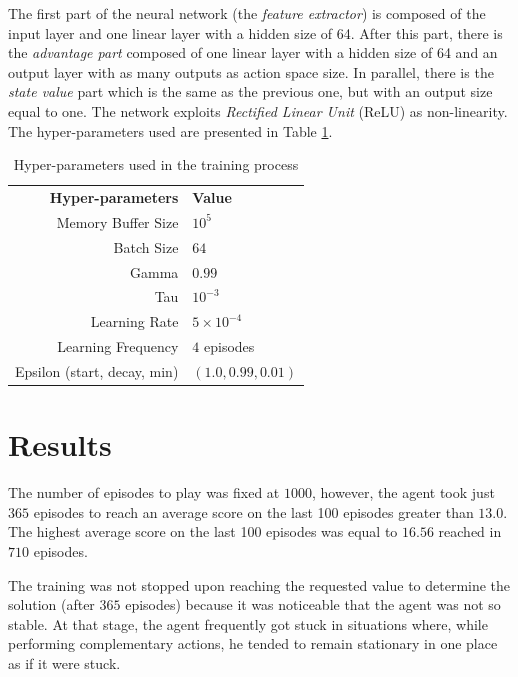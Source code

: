 \documentclass[letterpaper]{article}
\begin{document}
The first part of the neural network (the \textit{feature extractor}) is composed of the input layer and one linear layer with a hidden size of 64. After this part, there is the \textit{advantage part} composed of one linear layer with a hidden size of 64 and an output layer with as many outputs as action space size. In parallel, there is the \textit{state value} part which is the same as the previous one, but with an output size equal to one. The network exploits \textit{Rectified Linear Unit} (ReLU) as non-linearity. The hyper-parameters used are presented in Table \ref{table:hp}.

\begin{table}[]
\begin{tabular}{rl}
\textbf{Hyper-parameters}    & \textbf{Value}        \\
Memory Buffer Size          & $10^5$ \\
Batch Size                  & $64$                    \\
Gamma                       & $0.99$                  \\
Tau                         & $10^{-3}$                 \\
Learning Rate               & $5\times 10^{-4}$                  \\
Learning Frequency          & $4$ episodes            \\
Epsilon (start, decay, min) & $(1.0,0.99,0.01)$
\end{tabular}
\caption{Hyper-parameters used in the training process}
\label{table:hp}
\end{table}

\section{Results}

The number of episodes to play was fixed at $1000$, however, the agent took just $365$ episodes to reach an average score on the last 100 episodes greater than $13.0$. The highest average score on the last 100 episodes was equal to $16.56$ reached in $710$ episodes.

The training was not stopped upon reaching the requested value to determine the solution (after $365$ episodes) because it was noticeable that the agent was not so stable. At that stage, the agent frequently got stuck in situations where, while performing complementary actions, he tended to remain stationary in one place as if it were stuck.
\end{document}
